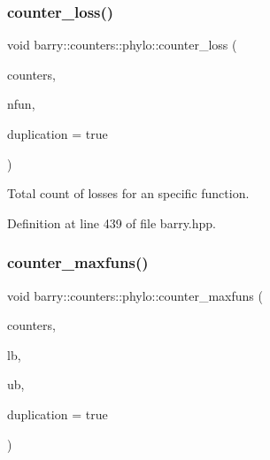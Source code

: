 \subsubsection{\texorpdfstring{counter\+\_\+loss()}{counter\_loss()}}
{\footnotesize\ttfamily void barry\+::counters\+::phylo\+::counter\+\_\+loss (\begin{DoxyParamCaption}\item[{\hyperlink{namespacebarry_1_1counters_1_1phylo_a4e401ffe66d04091343dcffaf915f8c3}{Phylo\+Counters} $\ast$}]{counters,  }\item[{std\+::vector$<$ \hyperlink{namespacebarry_a11dfc53ddb4672278319aa04f1e09a6c}{uint} $>$}]{nfun,  }\item[{bool}]{duplication = {\ttfamily true} }\end{DoxyParamCaption})\hspace{0.3cm}{\ttfamily [inline]}}



Total count of losses for an specific function. 



Definition at line 439 of file barry.\+hpp.

\mbox{\label{namespacebarry_1_1counters_1_1phylo_a80949b65fbe734d854742306065914bf}} 
\subsubsection{\texorpdfstring{counter\+\_\+maxfuns()}{counter\_maxfuns()}}
{\footnotesize\ttfamily void barry\+::counters\+::phylo\+::counter\+\_\+maxfuns (\begin{DoxyParamCaption}\item[{\hyperlink{namespacebarry_1_1counters_1_1phylo_a4e401ffe66d04091343dcffaf915f8c3}{Phylo\+Counters} $\ast$}]{counters,  }\item[{\hyperlink{namespacebarry_a11dfc53ddb4672278319aa04f1e09a6c}{uint}}]{lb,  }\item[{\hyperlink{namespacebarry_a11dfc53ddb4672278319aa04f1e09a6c}{uint}}]{ub,  }\item[{bool}]{duplication = {\ttfamily true} }\end{DoxyParamCaption})\hspace{0.3cm}{\ttfamily [inline]}}



